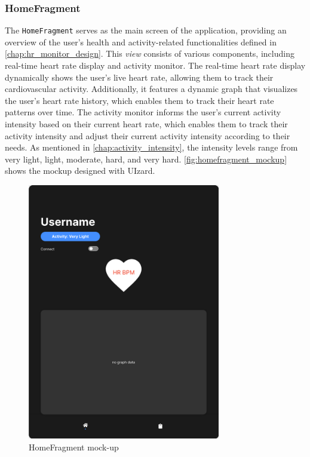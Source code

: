 \subsubsection{HomeFragment}
The \texttt{HomeFragment} serves as the main screen of the application, providing an overview of the user's health and activity-related functionalities defined in \autoref{chap:hr_monitor_design}. This \emph{view} consists of various components, including real-time heart rate display and activity monitor.
The real-time heart rate display dynamically shows the user's live heart rate, allowing them to track their cardiovascular activity. Additionally, it features a dynamic graph that visualizes the user's heart rate history, which enables them to track their heart rate patterns over time.
The activity monitor informs the user's current activity intensity based on their current heart rate, which enables them to track their activity intensity and adjust their current activity intensity according to their needs. As mentioned in \autoref{chap:activity_intensity}, the intensity levels range from very light, light, moderate, hard, and very hard.
\autoref{fig:homefragment_mockup} shows the mockup designed with UIzard.
\begin{figure}[H]
    \centering
    \includegraphics[width=0.75\textwidth]{images/home-fragment-mockup.png}
    \caption{HomeFragment mock-up}
    \label{fig:homefragment_mockup}
\end{figure}

